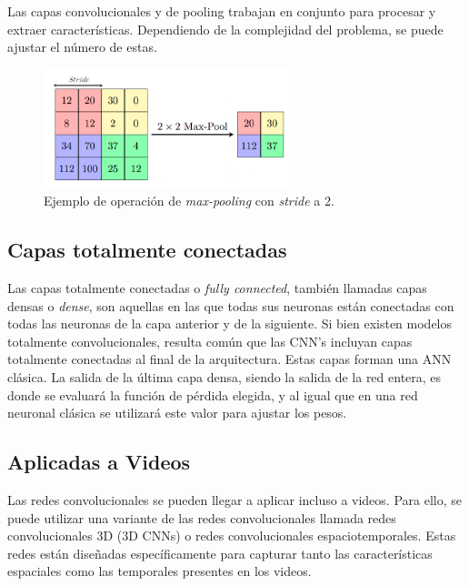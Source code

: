 Las capas convolucionales y de pooling trabajan en conjunto para procesar y extraer 
características. 
Dependiendo de la complejidad del problema, se puede ajustar el número de estas.

\begin{figure}[htp]
  \begin{center}
    \includegraphics[width=0.65\textwidth]{imagenes/chapter2/MaxpoolSample.png}
  \end{center}

  \caption{
    Ejemplo de operación de \emph{max-pooling} con \emph{stride} a 2.
  }
  \label{fig:PoolingExample}
\end{figure}

\subsection{Capas totalmente conectadas}
Las capas totalmente conectadas o \emph{fully connected}, también llamadas 
capas densas o \emph{dense}, son aquellas en las que todas sus neuronas 
están conectadas con todas las neuronas de la capa anterior y de la
siguiente. Si bien existen modelos totalmente convolucionales, resulta común
que las CNN's incluyan capas totalmente conectadas al final de la arquitectura.
Estas capas forman una ANN clásica.
La salida de la última capa densa, siendo la salida de la red entera, es donde
se evaluará la función de pérdida elegida, y al igual que en una red neuronal
clásica se utilizará este valor para ajustar los pesos.

\subsection{Aplicadas a Videos} 
Las redes convolucionales se pueden llegar a aplicar incluso a videos. 
Para ello, se puede utilizar una variante de las redes convolucionales llamada 
redes convolucionales 3D (3D CNNs) o redes convolucionales espaciotemporales. 
Estas redes están diseñadas específicamente para capturar tanto las características 
espaciales como las temporales presentes en los videos.

